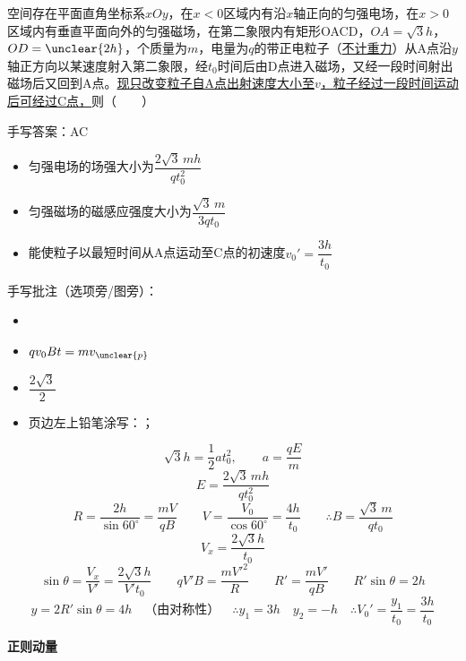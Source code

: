 \begin{problem}[13（贴纸印刷题）]
空间存在平面直角坐标系$xOy$，在$x<0$区域内有沿$x$轴正向的匀强电场，在$x>0$区域内有垂直平面向外的匀强磁场，在第二象限内有矩形OACD，$OA=\sqrt3h$，$OD=\unclear{2h}$，个质量为$m$，电量为$q$的带正电粒子（\underline{不计重力}）从A点沿$y$轴正方向以某速度射入第二象限，经$t_0$时间后由D点进入磁场，又经一段时间射出磁场后又回到A点。\underline{现只改变粒子自A点出射速度大小至$v$，}\underline{粒子经过一段时间运动后可经过C点，}则（　　）

手写答案：AC

\begin{itemize}
\item[A.] 匀强电场的场强大小为$\dfrac{2\sqrt3\,mh}{qt_0^2}$ %
\item[B.] 匀强磁场的磁感应强度大小为$\dfrac{\sqrt3\,m}{3qt_0}$ %
\item[C.] 能使粒子以最短时间从A点运动至C点的初速度$v_0'=\dfrac{3h}{t_0}$ %
\end{itemize}

手写批注（选项旁/图旁）：
\begin{itemize}
\item {} %
\item $qv_0Bt=mv_{\unclear{p}}$ %
\item $\dfrac{2\sqrt3}{2}$ %
\item 页边左上铅笔涂写：；
\end{itemize}


\begin{solution}
\[
\sqrt3h=\frac12at_0^2,\qquad a=\frac{qE}{m}
\]
\[
E=\frac{2\sqrt3\,mh}{qt_0^2}
\]
\[
R=\frac{2h}{\sin60^\circ}=\frac{mV}{qB}\qquad V=\frac{V_0}{\cos60^\circ}=\frac{4h}{t_0}\qquad\therefore B=\frac{\sqrt3\,m}{qt_0}
\]
\[
V_x=\frac{2\sqrt3h}{t_0}
\]
\[
\sin\theta=\frac{V_x}{V'}=\frac{2\sqrt3h}{V't_0}\qquad qV'B=\frac{mV'^2}{R}\qquad R'=\frac{mV'}{qB}\qquad R'\sin\theta=2h
\] %
\[
y=2R'\sin\theta=4h\quad\text{（由对称性）}\quad\therefore y_1=3h\quad y_2=-h\quad\therefore V_0'=\frac{y_1}{t_0}=\frac{3h}{t_0}
\]
\end{solution}
\end{problem}
\textbf{正则动量}

